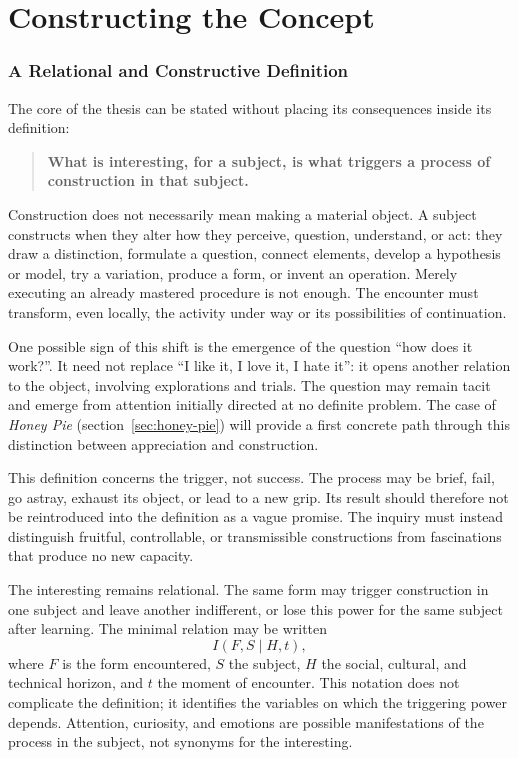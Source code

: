 \documentclass[11pt,a4paper]{article}
\begin{document}
\part{Constructing the Concept}

\section{A Relational and Constructive Definition}

The core of the thesis can be stated without placing its consequences inside
its definition:

\begin{quote}
\textbf{What is interesting, for a subject, is what triggers a process of
construction in that subject.}
\end{quote}

Construction does not necessarily mean making a material object. A subject
constructs when they alter how they perceive, question, understand, or act:
they draw a distinction, formulate a question, connect elements, develop a
hypothesis or model, try a variation, produce a form, or invent an operation.
Merely executing an already mastered procedure is not enough. The encounter
must transform, even locally, the activity under way or its possibilities of
continuation.

One possible sign of this shift is the emergence of the question
\enquote{how does it work?}. It need not replace \enquote{I like it,
I love it, I hate it}: it opens another relation to the object, involving
explorations and trials. The question may remain tacit and emerge from
attention initially directed at no definite problem. The case of
\emph{Honey Pie} (section~\ref{sec:honey-pie}) will provide a first concrete
path through this distinction between appreciation and construction.

This definition concerns the trigger, not success. The process may be brief,
fail, go astray, exhaust its object, or lead to a new grip. Its result should
therefore not be reintroduced into the definition as a vague promise. The
inquiry must instead distinguish fruitful, controllable, or transmissible
constructions from fascinations that produce no new capacity.

The interesting remains relational. The same form may trigger construction in
one subject and leave another indifferent, or lose this power for the same
subject after learning. The minimal relation may be written
\[
  I(F,S\mid H,t),
\]
where \(F\) is the form encountered, \(S\) the subject, \(H\) the social,
cultural, and technical horizon, and \(t\) the moment of encounter. This
notation does not complicate the definition; it identifies the variables on
which the triggering power depends. Attention, curiosity, and emotions are
possible manifestations of the process in the subject, not synonyms for the
interesting.
\end{document}
